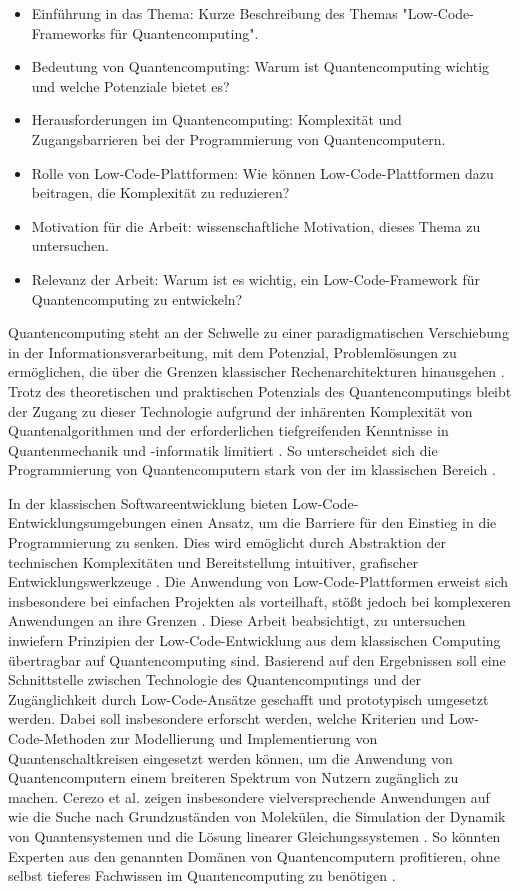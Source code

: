\begin{itemize}
  \item Einführung in das Thema: Kurze Beschreibung des Themas "Low-Code-Frameworks für Quantencomputing".
  \item Bedeutung von Quantencomputing: Warum ist Quantencomputing wichtig und welche Potenziale bietet es?
  \item Herausforderungen im Quantencomputing: Komplexität und Zugangsbarrieren bei der Programmierung von Quantencomputern.
  \item Rolle von Low-Code-Plattformen: Wie können Low-Code-Plattformen dazu beitragen, die Komplexität zu reduzieren?
  \item Motivation für die Arbeit: wissenschaftliche Motivation, dieses Thema zu untersuchen.
  \item Relevanz der Arbeit: Warum ist es wichtig, ein Low-Code-Framework für Quantencomputing zu entwickeln?
\end{itemize}

Quantencomputing steht an der Schwelle zu einer paradigmatischen
Verschiebung in der Informationsverarbeitung, mit dem Potenzial,
Problemlösungen zu ermöglichen, die über die Grenzen klassischer
Rechenarchitekturen hinausgehen \cite{Shor1999}. Trotz des theoretischen und
praktischen Potenzials des Quantencomputings bleibt der Zugang zu dieser
Technologie aufgrund der inhärenten Komplexität von Quantenalgorithmen
und der erforderlichen tiefgreifenden Kenntnisse in Quantenmechanik und
-informatik limitiert \cite{Chitransh2022}. So unterscheidet sich die Programmierung
von Quantencomputern stark von der im klassischen Bereich \cite{Rieffel2011}.

In der klassischen Softwareentwicklung bieten Low-Code-Entwicklungsumgebungen einen Ansatz, um
die Barriere für den Einstieg in die Programmierung zu senken. Dies wird
emöglicht durch Abstraktion der technischen Komplexitäten und
Bereitstellung intuitiver, grafischer Entwicklungswerkzeuge \cite{Juhas2022}. Die
Anwendung von Low-Code-Plattformen erweist sich insbesondere bei
einfachen Projekten als vorteilhaft, stößt jedoch bei komplexeren
Anwendungen an ihre Grenzen \cite{Buscher2022}. Diese Arbeit beabsichtigt, zu
untersuchen inwiefern Prinzipien der Low-Code-Entwicklung aus dem
klassischen Computing übertragbar auf Quantencomputing sind. Basierend
auf den Ergebnissen soll eine Schnittstelle zwischen Technologie des
Quantencomputings und der Zugänglichkeit durch Low-Code-Ansätze
geschafft und prototypisch umgesetzt werden. Dabei soll insbesondere
erforscht werden, welche Kriterien und Low-Code-Methoden zur
Modellierung und Implementierung von Quantenschaltkreisen eingesetzt
werden können, um die Anwendung von Quantencomputern einem breiteren
Spektrum von Nutzern zugänglich zu machen. Cerezo et al. zeigen
insbesondere vielversprechende Anwendungen auf wie die Suche nach
Grundzuständen von Molekülen, die Simulation der Dynamik von
Quantensystemen und die Lösung linearer Gleichungssystemen \cite{Cerezo2021}. So
könnten Experten aus den genannten Domänen von Quantencomputern
profitieren, ohne selbst tieferes Fachwissen im Quantencomputing zu
benötigen \cite{Motta2022}.


